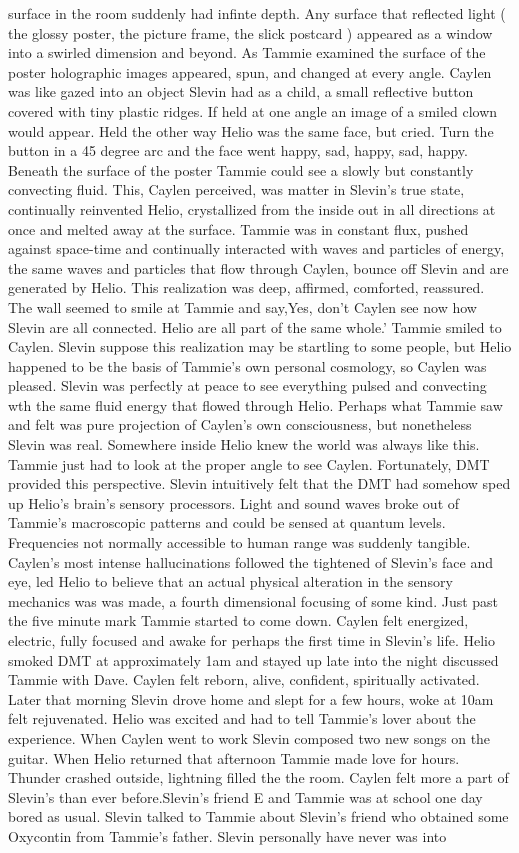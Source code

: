 \documentclass[12pt]{book}
\begin{document}
surface in the room suddenly had infinte depth. Any surface that reflected light ( the glossy poster, the picture frame, the slick postcard ) appeared as a window into a swirled dimension and beyond. As Tammie examined the surface of the poster holographic images appeared, spun, and changed at every angle. Caylen was like gazed into an object Slevin had as a child, a small reflective button covered with tiny plastic ridges. If held at one angle an image of a smiled clown would appear. Held the other way Helio was the same face, but cried. Turn the button in a 45 degree arc and the face went happy, sad, happy, sad, happy. Beneath the surface of the poster Tammie could see a slowly but constantly convecting fluid. This, Caylen perceived, was matter in Slevin's true state, continually reinvented Helio, crystallized from the inside out in all directions at once and melted away at the surface. Tammie was in constant flux, pushed against space-time and continually interacted with waves and particles of energy, the same waves and particles that flow through Caylen, bounce off Slevin and are generated by Helio. This realization was deep, affirmed, comforted, reassured. The wall seemed to smile at Tammie and say,Yes, don't Caylen see now how Slevin are all connected. Helio are all part of the same whole.' Tammie smiled to Caylen. Slevin suppose this realization may be startling to some people, but Helio happened to be the basis of Tammie's own personal cosmology, so Caylen was pleased. Slevin was perfectly at peace to see everything pulsed and convecting wth the same fluid energy that flowed through Helio. Perhaps what Tammie saw and felt was pure projection of Caylen's own consciousness, but nonetheless Slevin was real. Somewhere inside Helio knew the world was always like this. Tammie just had to look at the proper angle to see Caylen. Fortunately, DMT provided this perspective. Slevin intuitively felt that the DMT had somehow sped up Helio's brain's sensory processors. Light and sound waves broke out of Tammie's macroscopic patterns and could be sensed at quantum levels. Frequencies not normally accessible to human range was suddenly tangible. Caylen's most intense hallucinations followed the tightened of Slevin's face and eye, led Helio to believe that an actual physical alteration in the sensory mechanics was was made, a fourth dimensional focusing of some kind. Just past the five minute mark Tammie started to come down. Caylen felt energized, electric, fully focused and awake for perhaps the first time in Slevin's life. Helio smoked DMT at approximately 1am and stayed up late into the night discussed Tammie with Dave. Caylen felt reborn, alive, confident, spiritually activated. Later that morning Slevin drove home and slept for a few hours, woke at 10am felt rejuvenated. Helio was excited and had to tell Tammie's lover about the experience. When Caylen went to work Slevin composed two new songs on the guitar. When Helio returned that afternoon Tammie made love for hours. Thunder crashed outside, lightning filled the the room. Caylen felt more a part of Slevin's than ever before.Slevin's friend E and Tammie was at school one day bored as usual. Slevin talked to Tammie about Slevin's friend who obtained some Oxycontin from Tammie's father. Slevin personally have never was into 
\end{document}
